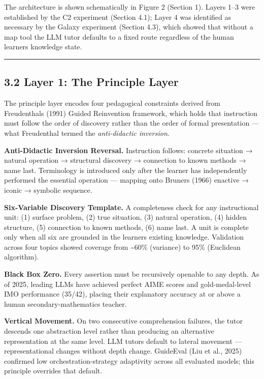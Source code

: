 \documentclass[
]{article}
\begin{document}
The architecture is shown schematically in Figure 2 (Section 1). Layers 1--3 were established by the C2 experiment (Section 4.1); Layer 4 was identified as necessary by the Galaxy experiment (Section 4.3), which showed that without a map tool the LLM tutor defaults to a fixed route regardless of the human learner\textquotesingle s knowledge state.

\begin{center}\rule{0.5\linewidth}{0.5pt}\end{center}

\subsection{3.2 Layer 1: The Principle Layer}\label{32-layer-1-the-principle-layer}

The principle layer encodes four pedagogical constraints derived from Freudenthal\textquotesingle s (1991) Guided Reinvention framework, which holds that instruction must follow the order of discovery rather than the order of formal presentation --- what Freudenthal termed the \emph{anti-didactic inversion}.

\textbf{Anti-Didactic Inversion Reversal.} Instruction follows: concrete situation → natural operation → structural discovery → connection to known methods → name last. Terminology is introduced only after the learner has independently performed the essential operation --- mapping onto Bruner\textquotesingle s (1966) enactive → iconic → symbolic sequence.

\textbf{Six-Variable Discovery Template.} A completeness check for any instructional unit: (1) surface problem, (2) true situation, (3) natural operation, (4) hidden structure, (5) connection to known methods, (6) name last. A unit is complete only when all six are grounded in the learner\textquotesingle s existing knowledge. Validation across four topics showed coverage from \textasciitilde60\% (variance) to 95\% (Euclidean algorithm).

\textbf{Black Box Zero.} Every assertion must be recursively openable to any depth. As of 2025, leading LLMs have achieved perfect AIME scores and gold-medal-level IMO performance (35/42), placing their explanatory accuracy at or above a human secondary-mathematics teacher.

\textbf{Vertical Movement.} On two consecutive comprehension failures, the tutor descends one abstraction level rather than producing an alternative representation at the same level. LLM tutors default to lateral movement --- representational changes without depth change. GuideEval (Liu et al., 2025) confirmed low orchestration-strategy adaptivity across all evaluated models; this principle overrides that default.
\end{document}
